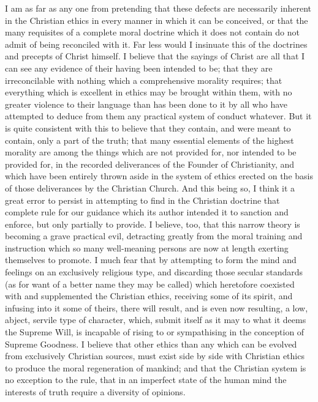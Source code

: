 \documentclass[11pt,openany]{book}
\begin{document}
I am as far as any one from pretending that these defects are necessarily inherent in the Christian ethics in every manner in which it can be conceived, or that the many requisites of a complete moral doctrine which it does not contain do not admit of being reconciled with it. Far less would I insinuate this of the doctrines and precepts of Christ himself. I believe that the sayings of Christ are all that I can see any evidence of their having been intended to be; that they are irreconcilable with nothing which a comprehensive morality requires; that everything which is excellent in ethics may be brought within them, with no greater violence to their language than has been done to it by all who have attempted to deduce from them any practical system of conduct whatever. But it is quite consistent with this to believe that they contain, and were meant to contain, only a part of the truth; that many essential elements of the highest morality are among the things which are not provided for, nor intended to be provided for, in the recorded deliverances of the Founder of Christianity, and which have been entirely thrown aside in the system of ethics erected on the basis of those deliverances by the Christian Church. And this being so, I think it a great error to persist in attempting to find in the Christian doctrine that complete rule for our guidance which its author intended it to sanction and enforce, but only partially to provide. I believe, too, that this narrow theory is becoming a grave practical evil, detracting greatly from the moral training and instruction which so many well-meaning persons are now at length exerting themselves to promote. I much fear that by attempting to form the mind and feelings on an exclusively religious type, and discarding those secular standards (as for want of a better name they may be called) which heretofore coexisted with and supplemented the Christian ethics, receiving some of its spirit, and infusing into it some of theirs, there will result, and is even now resulting, a low, abject, servile type of character, which, submit itself as it may to what it deems the Supreme Will, is incapable of rising to or sympathising in the conception of Supreme Goodness. I believe that other ethics than any which can be evolved from exclusively Christian sources, must exist side by side with Christian ethics to produce the moral regeneration of mankind; and that the Christian system is no exception to the rule, that in an imperfect state of the human mind the interests of truth require a diversity of opinions.
\end{document}
